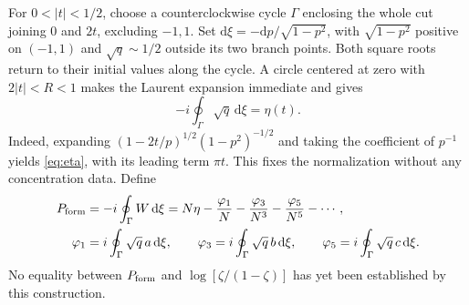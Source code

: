 \documentclass[10pt]{article}
\newcommand{\dd}{\mathrm d}
\newcommand{\ph}{\varphi}
\begin{document}
For $0<|t|<1/2$, choose a counterclockwise cycle $\Gamma$ enclosing the whole cut joining $0$ and $2t$, excluding $-1,1$. Set $\dd\xi=-\dd p/\sqrt{1-p^2}$, with $\sqrt{1-p^2}$ positive on $(-1,1)$ and $\sqrt q\sim1/2$ outside its two branch points. Both square roots return to their initial values along the cycle. A circle centered at zero with $2|t|<R<1$ makes the Laurent expansion immediate and gives
\begin{equation}
 -i\oint_\Gamma\sqrt q\,\dd\xi=\eta(t).
 \label{eq:cycleeta}
\end{equation}
Indeed, expanding $(1-2t/p)^{1/2}(1-p^2)^{-1/2}$ and taking the coefficient of $p^{-1}$ yields \eqref{eq:eta}, with its leading term $\pi t$. This fixes the normalization without any concentration data. Define
\begin{align}
 P_{\rm form}&=-i\oint_\Gamma W\,\dd\xi
       =N\eta-\frac{\ph_1}{N}-\frac{\ph_3}{N^3}-\frac{\ph_5}{N^5}-\cdots,\label{eq:P}\\
 \ph_1&=i\oint_\Gamma\sqrt q\,a\,\dd\xi,\qquad
 \ph_3=i\oint_\Gamma\sqrt q\,b\,\dd\xi,\qquad
 \ph_5=i\oint_\Gamma\sqrt q\,c\,\dd\xi.\label{eq:phis}
\end{align}
No equality between $P_{\rm form}$ and $\log[\zeta/(1-\zeta)]$ has yet been established by this construction.
\end{document}
